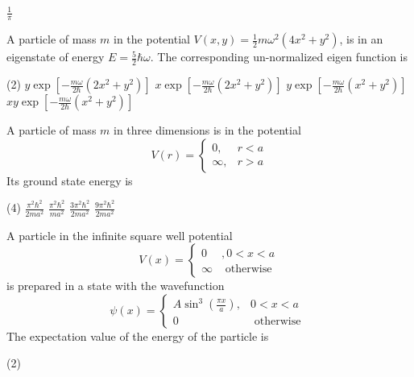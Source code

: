 \begin{enumerate}
\begin{tasks}
	\task[\textbf{D.}]$\frac{1}{\pi}$
\end{tasks}
\begin{minipage}{\textwidth}
	\item A particle of mass $m$ in the potential $V(x, y)=\frac{1}{2} m \omega^{2}\left(4 x^{2}+y^{2}\right)$, is in an eigenstate of energy $E=\frac{5}{2} \hbar \omega$. The corresponding un-normalized eigen function is
\end{minipage}
\begin{tasks}(2)
	\task[\textbf{A.}] $y \exp \left[-\frac{m \omega}{2 \hbar}\left(2 x^{2}+y^{2}\right)\right]$
	\task[\textbf{B.}]$x \exp \left[-\frac{m \omega}{2 \hbar}\left(2 x^{2}+y^{2}\right)\right]$
	\task[\textbf{C.}]$y \exp \left[-\frac{m \omega}{2 \hbar}\left(x^{2}+y^{2}\right)\right]$
	\task[\textbf{D.}]$x y \exp \left[-\frac{m \omega}{2 \hbar}\left(x^{2}+y^{2}\right)\right]$
\end{tasks}
\begin{minipage}{\textwidth}
	\item A particle of mass $m$ in three dimensions is in the potential
	$$
	V(r)= \begin{cases}0, & r<a \\ \infty, & r>a\end{cases}
	$$
	Its ground state energy is
\end{minipage}
\begin{tasks}(4)
	\task[\textbf{A.}] $\frac{\pi^{2} \hbar^{2}}{2 m a^{2}}$
	\task[\textbf{B.}]$\frac{\pi^{2} \hbar^{2}}{m a^{2}}$
	\task[\textbf{C.}]$\frac{3 \pi^{2} \hbar^{2}}{2 m a^{2}}$
	\task[\textbf{D.}]$\frac{9 \pi^{2} \hbar^{2}}{2 m a^{2}}$
\end{tasks}
\begin{minipage}{\textwidth}
	\item A particle in the infinite square well potential
	$$
	V(x)= \begin{cases}0 & , 0<x<a \\ \infty & \text { otherwise }\end{cases}
	$$
	is prepared in a state with the wavefunction
	$$
	\psi(x)= \begin{cases}A \sin ^{3}\left(\frac{\pi x}{a}\right), & 0<x<a \\ 0 & \text { otherwise }\end{cases}
	$$
	The expectation value of the energy of the particle is
\end{minipage}
\begin{tasks}(2)

\end{tasks}
\end{enumerate}

